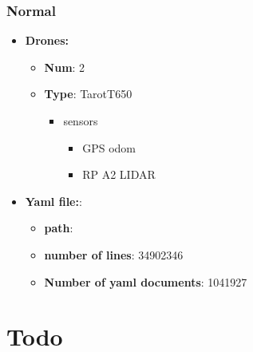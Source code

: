         \subsubsection{Normal}
            \begin{itemize}
                \item \textbf{Drones:}
                    \begin{itemize}
                        \item \textbf{Num}: 2
                        \item \textbf{Type}: TarotT650
                            \begin{itemize}
                                \item sensors
                                    \begin{itemize}
                                        \item GPS odom
                                        \item RP A2 LIDAR
                                    \end{itemize}
                            \end{itemize}
                    \end{itemize}
                \item \textbf{Yaml file:}:
                    \begin{itemize}
                        \item \textbf{path}: 
                        \item \textbf{number of lines}: 34902346
                        \item \textbf{Number of yaml documents}: 1041927
                    \end{itemize}
            \end{itemize}


\section{Todo}
